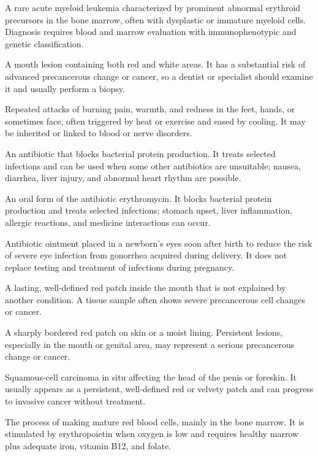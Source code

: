  A rare acute myeloid leukemia characterized by prominent abnormal erythroid precursors in the bone marrow, often with dysplastic or immature myeloid cells. Diagnosis requires blood and marrow evaluation with immunophenotypic and genetic classification.

 A mouth lesion containing both red and white areas. It has a substantial risk of advanced precancerous change or cancer, so a dentist or specialist should examine it and usually perform a biopsy.

 Repeated attacks of burning pain, warmth, and redness in the feet, hands, or sometimes face, often triggered by heat or exercise and eased by cooling. It may be inherited or linked to blood or nerve disorders.

 An antibiotic that blocks bacterial protein production. It treats selected infections and can be used when some other antibiotics are unsuitable; nausea, diarrhea, liver injury, and abnormal heart rhythm are possible.

 An oral form of the antibiotic erythromycin. It blocks bacterial protein production and treats selected infections; stomach upset, liver inflammation, allergic reactions, and medicine interactions can occur.

 Antibiotic ointment placed in a newborn’s eyes soon after birth to reduce the risk of severe eye infection from gonorrhea acquired during delivery. It does not replace testing and treatment of infections during pregnancy.

 A lasting, well-defined red patch inside the mouth that is not explained by another condition. A tissue sample often shows severe precancerous cell changes or cancer.

 A sharply bordered red patch on skin or a moist lining. Persistent lesions, especially in the mouth or genital area, may represent a serious precancerous change or cancer.

 Squamous-cell carcinoma in situ affecting the head of the penis or foreskin. It usually appears as a persistent, well-defined red or velvety patch and can progress to invasive cancer without treatment.

 The process of making mature red blood cells, mainly in the bone marrow. It is stimulated by erythropoietin when oxygen is low and requires healthy marrow plus adequate iron, vitamin B12, and folate.

